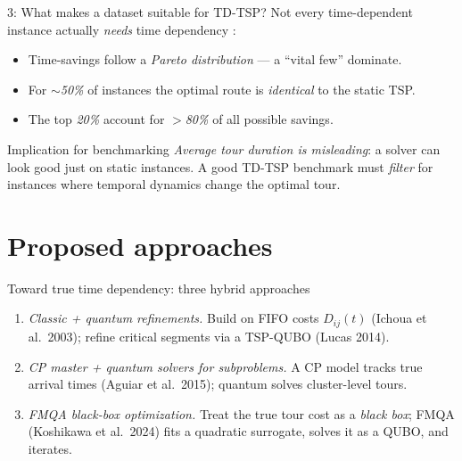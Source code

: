 \documentclass[
11pt,notheorems,hyperref={pdfauthor=Alma Arevalo Loyola}
]{beamer}
\renewcommand{\emphasize}[1]{\textcolor{emphasisblue}{\textit{#1}}}
\newcommand{\emphteal}[1]{\textcolor{emphasisteal}{\textit{#1}}}
\begin{document}
\begin{frame}{3: What makes a dataset suitable for TD-TSP?}
  \small
  Not every time-dependent instance actually \emphasize{needs} time dependency \cite{yang2025neural}:
  \begin{itemize}
    \item Time-savings follow a \emphasize{Pareto distribution} --- a ``vital few'' dominate.
    \item For $\sim$\emphasize{50\%} of instances the optimal route is \emphteal{identical} to the static TSP.
    \item The top \emphasize{20\%} account for $>$\emphasize{80\%} of all possible savings.
  \end{itemize}
  \vspace{0.2em}
  \begin{block}{Implication for benchmarking}
    \emphteal{Average tour duration is misleading}: a solver can look good just on static instances. A good TD-TSP benchmark must \emphasize{filter} for instances where temporal dynamics change the optimal tour.
  \end{block}
\end{frame}

\section{Proposed approaches}

\begin{frame}{Toward true time dependency: three hybrid approaches}
  \nocite{ichoua2003vehicle,lucas2014ising,kitai2020designing,koshikawa2024efficient}
  \small
  \begin{enumerate}\setlength{\itemsep}{6pt}
    \item \emphteal{Classic + quantum refinements.}
      Build on FIFO costs $D_{ij}(t)$ (Ichoua et al.\ 2003); refine critical segments via a TSP-QUBO (Lucas 2014).
    \item \emphteal{CP master + quantum solvers for subproblems.}
      A CP model tracks true arrival times (Aguiar et al.\ 2015); quantum solves cluster-level tours.
    \item \emphteal{FMQA black-box optimization.}
      Treat the true tour cost as a \emphasize{black box}; FMQA (Koshikawa et al.\ 2024) fits a quadratic surrogate, solves it as a QUBO, and iterates.
  \end{enumerate}
\end{frame}
\end{document}
